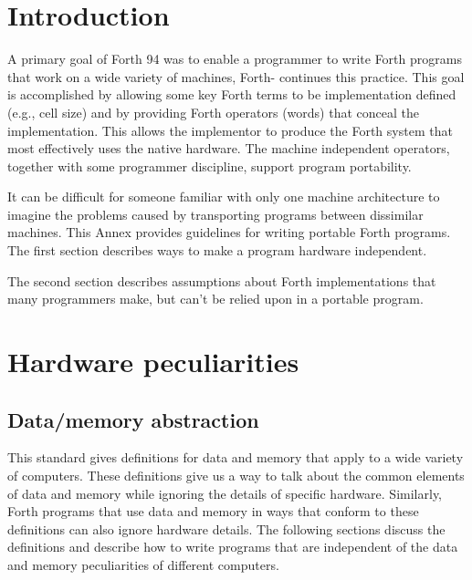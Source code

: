 \label{annex:port}

\section{Introduction} %
\label{port:intro}

A primary goal of Forth 94 was to enable a programmer to write Forth
programs that work on a wide variety of machines, Forth-\snapshot{}
continues this practice.  This goal is accomplished by allowing some
key Forth terms to be implementation defined (e.g., cell size) and
by providing Forth operators (words) that conceal the implementation.
This allows the implementor to produce the Forth system that most
effectively uses the native hardware. The machine independent
operators, together with some programmer discipline, support program
portability.

It can be difficult for someone familiar with only one machine
architecture to imagine the problems caused by transporting programs
between dissimilar machines.
This Annex provides guidelines for writing portable Forth programs.
The first section describes ways to make a program hardware independent.

The second section describes assumptions about Forth implementations
that many programmers make, but can't be relied upon in a portable program.


\section{Hardware peculiarities} %
\label{port:hardware}

\subsection{Data/memory abstraction} %

This standard gives definitions for data and memory that
apply to a wide variety of computers. These definitions give us a way
to talk about the common elements of data and memory while ignoring
the details of specific hardware. Similarly, Forth programs that
use data and memory in ways that conform to these definitions can
also ignore hardware details. The following sections discuss the
definitions and describe how to write programs that are independent
of the data and memory peculiarities of different computers.

